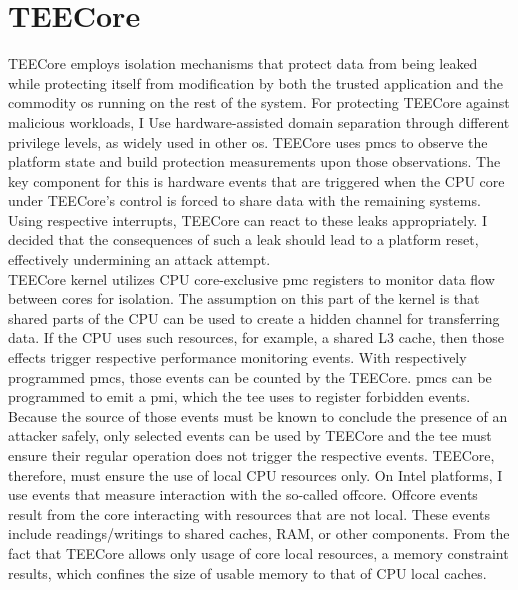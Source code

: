 \section{TEECore}
\label{sec:30:tee_kernel}
TEECore employs isolation mechanisms that protect data from being leaked while
protecting itself from modification by both the trusted application and the
commodity \gls{os} running on the rest of the system. For protecting TEECore
against malicious workloads, I Use hardware-assisted domain separation through
different privilege levels, as widely used in other \gls{os}. TEECore uses
\glspl{pmc} to observe the platform state and build protection measurements upon
those observations. The key component for this is hardware events that are
triggered when the CPU core under TEECore's control is forced to share data with
the remaining systems. Using respective interrupts, TEECore can react to these
leaks appropriately. I decided that the consequences of such a leak should lead
to a platform reset, effectively undermining an attack attempt.\\

TEECore kernel utilizes CPU core-exclusive \gls{pmc} registers to monitor data
flow between cores for isolation. The assumption on this part of the kernel is
that shared parts of the CPU can be used to create a hidden channel for
transferring data. If the CPU uses such resources, for example, a shared L3
cache, then those effects trigger respective performance monitoring events. With
respectively programmed \glspl{pmc}, those events can be counted by the TEECore.
\glspl{pmc} can be programmed to emit a \gls{pmi}, which the \gls{tee} uses to
register forbidden events. Because the source of those events must be known to
conclude the presence of an attacker safely, only selected events can be used by
TEECore and the \gls{tee} must ensure their regular operation does not trigger
the respective events. TEECore, therefore, must ensure the use of local CPU
resources only. On Intel platforms, I use events that measure interaction with
the so-called offcore. Offcore events result from the core interacting with
resources that are not local. These events include readings/writings to shared
caches, RAM, or other components. From the fact that TEECore allows only usage
of core local resources, a memory constraint results, which confines the size of
usable memory to that of CPU local caches.\\

